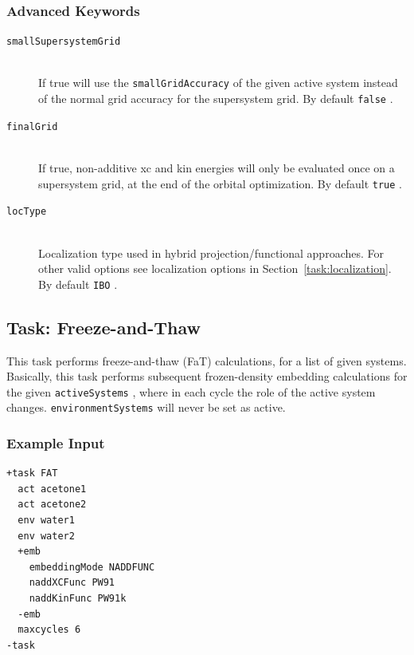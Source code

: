 \documentclass[bibliography=totocnumbered,a4paper,10pt,oneside]{scrbook}
\newcommand{\ttt}[1]{%
  \begingroup\setlength{\fboxsep}{1pt}%
  \colorbox{serenity-green!30}{\texttt{\hspace*{2pt}\vphantom{(g}#1\hspace*{2pt}}}%
  \endgroup
}
\begin{document}
\subsubsection{Advanced Keywords}
\begin{description}
	\item [\texttt{smallSupersystemGrid}]\hfill \\
	If true will use the \ttt{smallGridAccuracy} of the given active system instead of the normal grid accuracy for the supersystem grid. By default \ttt{false}.
	\item [\texttt{finalGrid}]\hfill \\
	If true, non-additive xc and kin energies will only be evaluated once on a supersystem grid, at the end of the orbital optimization. By default \ttt{true}.
	\item [\texttt{locType}]\hfill \\
	Localization type used in hybrid projection/functional approaches. For other valid options see localization options in Section~\ref{task:localization}. By default \ttt{IBO}.
\end{description}

\subsection{Task: Freeze-and-Thaw}
\label{sec:FAT}
This task performs freeze-and-thaw (FaT) calculations, for a list of given systems. Basically, this task
performs subsequent frozen-density embedding calculations for the given \ttt{activeSystems}, where in each
cycle the role of the active system changes. \ttt{environmentSystems} will never be set as active.
\subsubsection{Example Input}
\begin{lstlisting}
+task FAT
  act acetone1
  act acetone2
  env water1
  env water2
  +emb
    embeddingMode NADDFUNC
    naddXCFunc PW91
    naddKinFunc PW91k
  -emb
  maxcycles 6
-task
\end{lstlisting}
\end{document}
